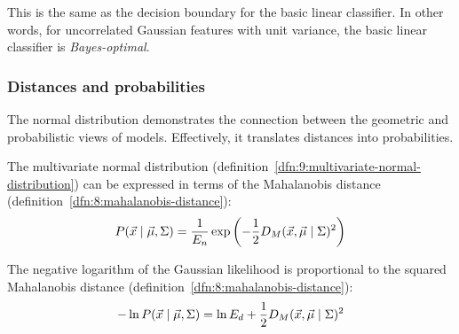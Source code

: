 This is the same as the decision boundary for the basic linear classifier.
In other words, for uncorrelated Gaussian features with unit variance, the basic
linear classifier is \textit{Bayes-optimal}.

\subsubsection{Distances and probabilities}

The normal distribution demonstrates the connection between the geometric and
probabilistic views of models.
Effectively, it translates distances into probabilities.

\begin{dfn}
  \label{dfn:9:normal-mahalanobis}
  The multivariate normal distribution
  (definition~\ref{dfn:9:multivariate-normal-distribution})
  can be expressed in terms of the Mahalanobis distance
  (definition~\ref{dfn:8:mahalanobis-distance}):
  \begin{equation}
    P(\vec{x} \mid \vec{\mu}, \Sigma)
    = \frac{1}{E_n} \exp \left(
    -\frac{1}{2} D_M (\vec{x}, \vec{\mu} \mid \Sigma)^2
    \right)
  \end{equation}
\end{dfn}

\begin{dfn}
  \label{dfn:9:normal-log-likelihood}
  The negative logarithm of the Gaussian likelihood is proportional to the
  squared Mahalanobis distance (definition~\ref{dfn:8:mahalanobis-distance}):
  \begin{equation}
    - \ln P(\vec{x} \mid \vec{\mu}, \Sigma)
    = \ln E_d + \frac{1}{2} D_M (\vec{x}, \vec{\mu} \mid \Sigma)^2
  \end{equation}
\end{dfn}

